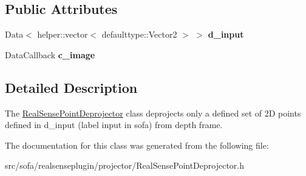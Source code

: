 \subsection*{Public Attributes}
\begin{DoxyCompactItemize}
\item 
\mbox{\label{classsofa_1_1rgbdtracking_1_1_real_sense_point_deprojector_a93e870b27e925201cd94f0e3c353ba94}} 
Data$<$ helper\+::vector$<$ defaulttype\+::\+Vector2 $>$ $>$ {\bfseries d\+\_\+input}
\item 
\mbox{\label{classsofa_1_1rgbdtracking_1_1_real_sense_point_deprojector_a66a99e38b3bdc576ed7da5df8307aa89}} 
Data\+Callback {\bfseries c\+\_\+image}
\end{DoxyCompactItemize}


\subsection{Detailed Description}
The \hyperlink{classsofa_1_1rgbdtracking_1_1_real_sense_point_deprojector}{Real\+Sense\+Point\+Deprojector} class deprojects only a defined set of 2D points defined in d\+\_\+input (label input in sofa) from depth frame. 

The documentation for this class was generated from the following file\+:\begin{DoxyCompactItemize}
\item 
src/sofa/realsenseplugin/projector/Real\+Sense\+Point\+Deprojector.\+h\end{DoxyCompactItemize}
